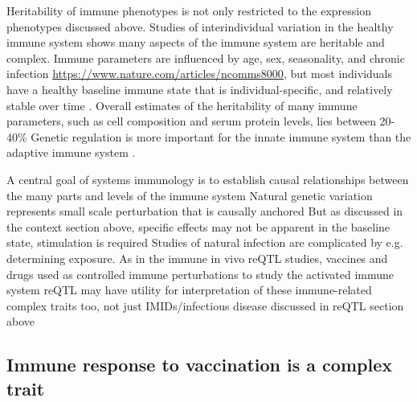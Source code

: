 \begin{outline}
\1 Heritability of immune phenotypes is not only restricted to the expression phenotypes discussed above.
    \2 Studies of interindividual variation in the healthy immune system shows many aspects of the immune system are heritable and complex.
    \2 Immune parameters are influenced by age, sex, seasonality, and chronic infection \autocite{brodin2015VariationHumanImmune,liston2016ShapingVariationHuman,brodin2017HumanImmuneSystem,patin2018NaturalVariationParameters,liston2018OriginsDiversityHuman} \url{https://www.nature.com/articles/ncomms8000},
    but most individuals have a healthy baseline immune state that is individual-specific, 
    and relatively stable over time \autocite{liston2016ShapingVariationHuman,brodin2017HumanImmuneSystem,lakshmikanth2020HumanImmuneSystem}.
    \2 Overall estimates of the heritability of many immune parameters, such as cell composition and serum protein levels, lies between 20-40\% \autocite{liston2016ShapingVariationHuman,brodin2017HumanImmuneSystem,patin2018NaturalVariationParameters,liston2018OriginsDiversityHuman}
    \2 Genetic regulation is more important for the innate immune system than the adaptive immune system \autocite{patin2018NaturalVariationParameters}.

\1 A central goal of systems immunology is to establish causal relationships between the many parts and levels of the immune system
    \2 Natural genetic variation represents small scale perturbation that is causally anchored \autocite{tsang2015UtilizingPopulationVariation,villani2018SystemsImmunologyLearning}
    \2 But as discussed in the context section above, specific effects may not be apparent in the baseline state, stimulation is required
    \2 Studies of natural infection are complicated by e.g. determining exposure.
    \2 As in the immune in vivo reQTL studies, vaccines and drugs used as controlled immune perturbations to study the activated immune system
    \2 reQTL may have utility for interpretation of these immune-related complex traits too, not just IMIDs/infectious disease discussed in reQTL section above

\subsection{Immune response to vaccination is a complex trait}


\end{outline}
